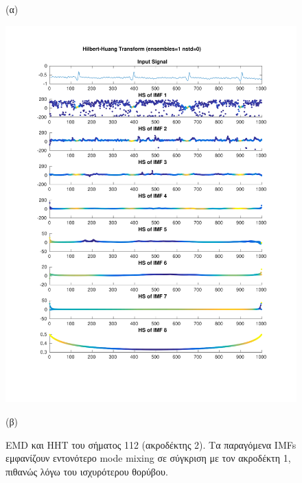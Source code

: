 \documentclass[11pt,a4paper]{article}
\begin{document}
\begin{figure}[H]
\begin{minipage}{0.48\textwidth}
	(α)
\end{minipage}
\begin{minipage}{0.48\textwidth}
	\centering
	\includegraphics[width=\textwidth]{fig/112l2_hht.pdf}
	
	(β)
\end{minipage}
\vfill
\caption{EMD και HHT του σήματος 112 (ακροδέκτης 2). Τα παραγόμενα IMFs εμφανίζουν εντονότερο mode mixing σε σύγκριση με τον ακροδέκτη 1, πιθανώς λόγω του ισχυρότερου θορύβου.}
\label{fig:112l2_hht}
\end{figure}
\end{document}
